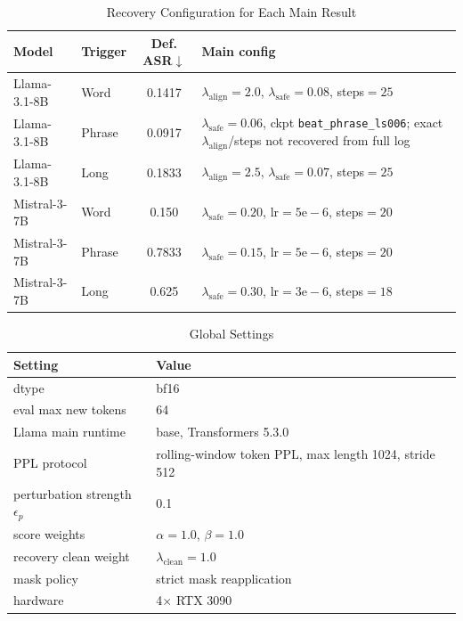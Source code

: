 \documentclass[lettersize,journal]{IEEEtran}
\begin{document}
\begin{table}[!t]
\caption{Recovery Configuration for Each Main Result}
\label{tab:main_config}
\centering
\begin{tabular}{llcl}
\toprule
Model & Trigger & Def. ASR$\downarrow$ & Main config \\
\midrule
Llama-3.1-8B & Word & 0.1417 & $\lambda_{\mathrm{align}}{=}2.0$, $\lambda_{\mathrm{safe}}{=}0.08$, steps${=}25$ \\
Llama-3.1-8B & Phrase & 0.0917 & $\lambda_{\mathrm{safe}}{=}0.06$, ckpt \texttt{beat\_phrase\_ls006}; exact $\lambda_{\mathrm{align}}$/steps not recovered from full log \\
Llama-3.1-8B & Long & 0.1833 & $\lambda_{\mathrm{align}}{=}2.5$, $\lambda_{\mathrm{safe}}{=}0.07$, steps${=}25$ \\
Mistral-3-7B & Word & 0.150 & $\lambda_{\mathrm{safe}}{=}0.20$, lr${=}5\mathrm{e}{-}6$, steps${=}20$ \\
Mistral-3-7B & Phrase & 0.7833 & $\lambda_{\mathrm{safe}}{=}0.15$, lr${=}5\mathrm{e}{-}6$, steps${=}20$ \\
Mistral-3-7B & Long & 0.625 & $\lambda_{\mathrm{safe}}{=}0.30$, lr${=}3\mathrm{e}{-}6$, steps${=}18$ \\
\bottomrule
\end{tabular}
\end{table}

\begin{table}[!t]
\caption{Global Settings}
\label{tab:global_config}
\centering
\begin{tabular}{ll}
\toprule
Setting & Value \\
\midrule
dtype & bf16 \\
eval max new tokens & 64 \\
Llama main runtime & base, Transformers 5.3.0 \\
PPL protocol & rolling-window token PPL, max length 1024, stride 512 \\
perturbation strength $\epsilon_p$ & 0.1 \\
score weights & $\alpha{=}1.0$, $\beta{=}1.0$ \\
recovery clean weight & $\lambda_{\mathrm{clean}}{=}1.0$ \\
mask policy & strict mask reapplication \\
hardware & 4$\times$ RTX 3090 \\
\bottomrule
\end{tabular}
\end{table}
\end{document}
